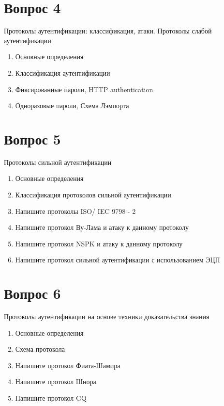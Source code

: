 \documentclass[a4paper,12pt]{article}
\begin{document}
	\section{Вопрос 4}
	Протоколы аутентификации: классификация, атаки. Протоколы слабой аутентификации
	\begin{enumerate}
		\item Основные определения
		\item Классификация аутентификации
		\item Фиксированные пароли, HTTP authentication
		\item Одноразовые пароли, Схема Лэмпорта
	\end{enumerate}
	\newpage
	
	
	\section{Вопрос 5}
	Протоколы сильной аутентификации
	\begin{enumerate}
		\item Основные определения
		\item Классификация протоколов сильной аутентификации
		\item Напишите протоколы ISO/ IEC 9798 - 2
		\item Напишите протокол Ву-Лама и атаку к данному протоколу
		\item Напишите протокол NSPK и атаку к данному протоколу
		\item Напишите протокол сильной аутентификации с использованием ЭЦП
	\end{enumerate}
	\newpage
	
	\section{Вопрос 6}
	Протоколы аутентификации на основе техники доказательства знания
	\begin{enumerate}
		\item Основные определения
		\item Схема протокола
		\item Напишите протокол Фиата-Шамира
		\item Напишите протокол Шнора
		\item Напишите протокол GQ
	\end{enumerate}
	\newpage
	
\end{document}
